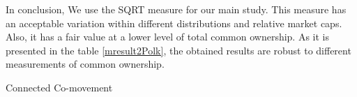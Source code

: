 \begin{appendices}
In conclusion, We use the SQRT measure for our main study. This measure has an acceptable variation within different distributions and relative market caps. Also, it has a fair value at a lower level of total common ownership. 
	As it is presented in the table \ref{mresult2Polk}, the obtained results are robust to different measurements of common ownership.

	{\begin{table}[htbp]
			\caption{Connected Co-movement}
			\label{mresult2Polk}
			\resizebox{1\textwidth}{!}{
			{}
			}
	\end{table}}
	
	\FloatBarrier
	
\end{appendices}
